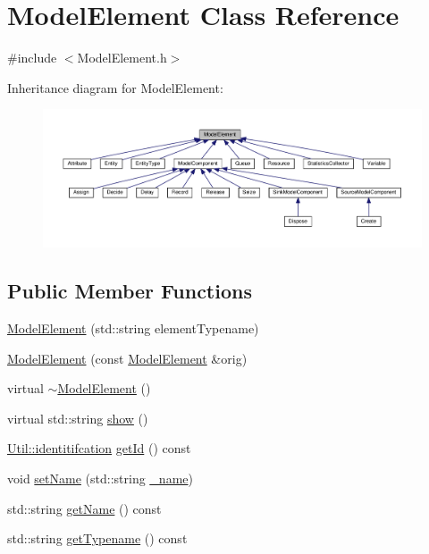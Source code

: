 \hypertarget{class_model_element}{}\section{Model\+Element Class Reference}
\label{class_model_element}


{\ttfamily \#include $<$Model\+Element.\+h$>$}



Inheritance diagram for Model\+Element\+:\nopagebreak
\begin{figure}[H]
\begin{center}
\leavevmode
\includegraphics[width=350pt]{class_model_element__inherit__graph}
\end{center}
\end{figure}
\subsection*{Public Member Functions}
\begin{DoxyCompactItemize}
\item 
\hyperlink{class_model_element_a8cb53d16512e648747de7058b4b00a37}{Model\+Element} (std\+::string element\+Typename)
\item 
\hyperlink{class_model_element_a6bbef312934c92b21a30b26519d330b2}{Model\+Element} (const \hyperlink{class_model_element}{Model\+Element} \&orig)
\item 
virtual \hyperlink{class_model_element_a5f77e160e46e32e03d2e5216836dc4ed}{$\sim$\+Model\+Element} ()
\item 
virtual std\+::string \hyperlink{class_model_element_af084d684e8effe5cd4c2265abc98896c}{show} ()
\item 
\hyperlink{class_util_ad17d458d9344b10bba64347e514d6d71}{Util\+::identitifcation} \hyperlink{class_model_element_af03e72d71099042c2bda655931ff1676}{get\+Id} () const 
\item 
void \hyperlink{class_model_element_a65b0d7ea652832d8e2369b3daf97b208}{set\+Name} (std\+::string \hyperlink{class_model_element_a4596c8a39e5df84d6f34249289eeeab8}{\+\_\+name})
\item 
std\+::string \hyperlink{class_model_element_afd840f06567a2b5621464f5314ae066e}{get\+Name} () const 
\item 
std\+::string \hyperlink{class_model_element_acacd0f10f4d3f0db9b8d2ddbbc186c99}{get\+Typename} () const 
\end{DoxyCompactItemize}
